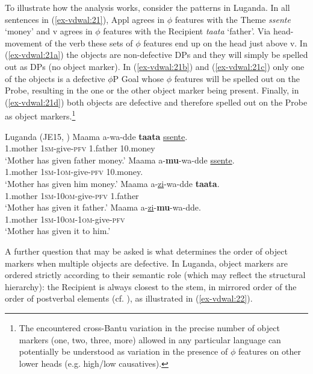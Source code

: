 \documentclass[output=paper
,modfonts
,nonflat]{langsci/langscibook}
\begin{document}
To illustrate how the analysis works, consider the patterns in Luganda. In all sentences in (\ref{ex-vdwal:21}), Appl agrees in $\phi $ features with the Theme \textit{ssente} ‘money’ and v agrees in $\phi$ features with the Recipient \textit{taata} ‘father’. Via head-movement of the verb these sets of $\phi$ features end up on the head just above v. In (\ref{ex-vdwal:21a}) the objects are non-defective DPs and they will simply be spelled out as DPs (no object marker). In (\ref{ex-vdwal:21b}) and (\ref{ex-vdwal:21c}) only one of the objects is a defective $\phi$P Goal whose $\phi$ features will be spelled out on the Probe, resulting in the one or the other object marker being present. Finally, in (\ref{ex-vdwal:21d}) both objects are defective and therefore spelled out on the Probe as object markers.\footnote{The encountered cross-Bantu variation in the precise number of object markers (one, two, three, more) allowed in any particular language \citep{Polak1986, Marlo2015} can potentially be understood as variation in the presence of $\phi$ features on other lower heads (e.g. high/low causatives).}

\begin{exe}
\ex	Luganda (JE15, \citealt[67, 72]{Ssekiryango2006}) \label{ex-vdwal:21}
	\xlist
	\ex \label{ex-vdwal:21a}
		\gll Maama a-wa-dde \textbf{taata} \underline{ssente}.\\
		1.mother \textsc{1sm}-give-\textsc{pfv} 1.father 10.money \\ 
		\glt `Mother has given father money.'
	\ex  \label{ex-vdwal:21b}
		\gll  Maama a-\textbf{mu}-wa-dde \underline{ssente}. \\
		1.mother \textsc{1sm}-\textsc{1om}-give-\textsc{pfv} 10.money. \\
		\glt `Mother has given him money.'
	\ex  \label{ex-vdwal:21c}
		\gll Maama a-\underline{zi}-wa-dde \textbf{taata}.\\
		1.mother \textsc{1sm}-\textsc{10om-}give-\textsc{pfv} 1.father\\
		\glt `Mother has given it father.'
	\ex  \label{ex-vdwal:21d}
		\gll Maama a-\underline{zi}-\textbf{mu}-wa-dde.\\
		1.mother \textsc{1sm}-\textsc{10om-1om-}give-\textsc{pfv}\\  
		\glt `Mother has given it to him.'
	\endxlist
\end{exe}
A further question that may be asked is what determines the order of object markers when multiple objects are defective. In Luganda, object markers are ordered strictly according to their semantic role (which may reflect the structural hierarchy): the Recipient is always closest to the stem, in mirrored order of the order of postverbal elements (cf. \citealt{Baker1985, Baker1988}), as illustrated in (\ref{ex-vdwal:22}).
\end{document}
